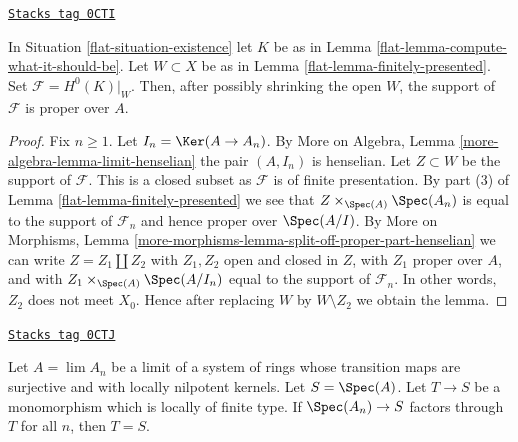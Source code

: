 \begin{lemma}
\label{flat-lemma-proper-support}
\href{https://stacks.math.columbia.edu/tag/0CTI}{\texttt{Stacks tag 0CTI}}

In Situation \ref{flat-situation-existence} let $K$ be as in
Lemma \ref{flat-lemma-compute-what-it-should-be}. Let $W \subset X$
be as in Lemma \ref{flat-lemma-finitely-presented}.
Set $\mathcal{F} = H^0(K)|_W$. Then, after possibly shrinking the open $W$,
the support of $\mathcal{F}$ is proper over $A$.
\end{lemma}

\begin{proof}

Fix $n \geq 1$. Let $I_n = \Ker(A \to A_n)$.
By More on Algebra, Lemma \ref{more-algebra-lemma-limit-henselian}
the pair $(A, I_n)$ is henselian.
Let $Z \subset W$ be the support of $\mathcal{F}$.
This is a closed subset as $\mathcal{F}$ is of finite presentation.
By part (3) of Lemma \ref{flat-lemma-finitely-presented}
we see that $Z \times_{\Spec(A)} \Spec(A_n)$
is equal to the support of $\mathcal{F}_n$ and hence
proper over $\Spec(A/I)$.
By More on Morphisms, Lemma
\ref{more-morphisms-lemma-split-off-proper-part-henselian}
we can write $Z = Z_1 \amalg Z_2$ with $Z_1, Z_2$ open and
closed in $Z$, with $Z_1$ proper
over $A$, and with $Z_1 \times_{\Spec(A)} \Spec(A/I_n)$
equal to the support of $\mathcal{F}_n$.
In other words, $Z_2$ does not meet $X_0$.
Hence after replacing $W$ by $W \setminus Z_2$ we obtain the lemma.
\end{proof}

\begin{lemma}
\label{flat-lemma-monomorphism-isomorphism}
\href{https://stacks.math.columbia.edu/tag/0CTJ}{\texttt{Stacks tag 0CTJ}}

Let $A = \lim A_n$ be a limit of a system of rings
whose transition maps are surjective and with locally nilpotent
kernels. Let $S = \Spec(A)$. Let $T \to S$ be a monomorphism
which is locally of finite type. If $\Spec(A_n) \to S$
factors through $T$ for all $n$, then $T = S$.
\end{lemma}

